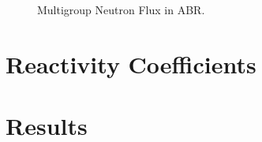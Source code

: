   \begin{figure}
    \centering
    \hspace{0.2in}
    \caption{Multigroup Neutron Flux in ABR.}
    \label{fig:abr_fluxes}
  \end{figure}

\section{Reactivity Coefficients}
\label{sec:reactivity_coefficients}

\section{Results}
\label{sec:results}

